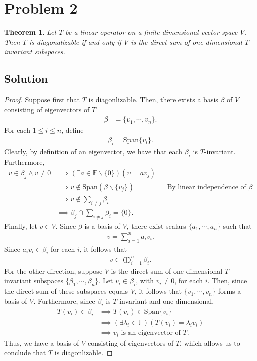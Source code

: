 \documentclass[10pt,a4paper]{article}
\newtheorem{theorem}{Theorem}
\theoremstyle{definition}
\begin{document}
\section*{Problem 2}
\begin{theorem}
Let $T$ be a linear operator on a finite-dimensional vector space $V$. Then $T$ is diagonalizable if and only if $V$ is the direct sum of one-dimensional $T$-invariant subspaces.
\end{theorem}

\subsection*{Solution}
\begin{proof}
Suppose first that $T$ is diagonlizable. Then, there exists a basis $\beta$ of $V$ consisting of eigenvectors of $T$
\begin{align*}
\beta &= \{v_1, \cdots, v_n \}.
\end{align*}
For each $1 \leq i \leq n$, define 
\begin{align*}
\beta_i = \text{Span} \{v_i \}.
\end{align*}
Clearly, by definition of an eigenvector, we have that each $\beta_i$ is $T$-invariant. Furthermore,
\begin{align*}
v \in \beta_j \land v \not= 0 &\implies (\exists a \in \mathbb{F} \backslash \{0\})(v = av_j)\\
&\implies v \not \in \text{Span} (\beta \backslash \{v_j \}) && \text{By linear independence of } \beta\\
&\implies v \not \in \sum_{i \not= j} \beta_i\\
&\implies \beta_j \cap \sum_{i \not= j} \beta_i = \{0\}.
\end{align*}
Finally, let $v \in V$. Since $\beta$ is a basis of $V$, there exist scalars $\{a_1, \cdots, a_n\}$ such that
\begin{align*}
v = \sum_{i = 1}^n a_i v_i.
\end{align*}
Since $a_i v_i \in \beta_i$ for each $i$, it follows that 
\begin{align*}
v \in \bigoplus_{i=1}^n \beta_i.
\end{align*}
For the other direction, suppose $V$ is the direct sum of one-dimensional $T$-invariant subspaces $\{\beta_1, \cdots, \beta_n\}$. Let $v_i \in \beta_i$, with $v_i \not = 0$, for each $i$. Then, since the direct sum of these subspaces equals $V$, it follows that $\{v_1, \cdots, v_n \}$ forms a basis of $V$. Furthermore, since $\beta_i$ is $T$-invariant and one dimensional,
\begin{align*}
T(v_i) \in \beta_i &\implies T(v_i) \in \text{Span} \{v_i\}\\
&\implies (\exists \lambda_i \in \mathbb{F})(T(v_i) = \lambda_i v_i)\\
&\implies v_i \text{ is an eigenvector of } T.
\end{align*}
Thus, we have a basis of $V$ consisting of eigenvectors of $T$, which allows us to conclude that $T$ is diagonlizable.
\end{proof}
\end{document}
